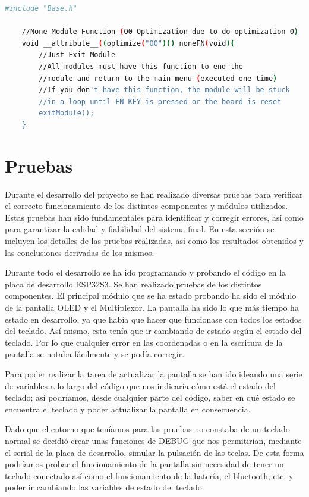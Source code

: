 \begin{lstlisting}[style=console, language=bash, caption={La función base vacía que no hace nada a forma de ejemplo. En base.h y base.cpp}, label={code:BaseFuncion}]
    #include "Base.h"

    //None Module Function (O0 Optimization due to do optimization 0)
    void __attribute__((optimize("O0"))) noneFN(void){
        //Just Exit Module
        //All modules must have this function to end the
        //module and return to the main menu (executed one time)
        //If you don't have this function, the module will be stuck 
        //in a loop until FN KEY is pressed or the board is reset
        exitModule();
    }
\end{lstlisting}

\section{Pruebas}\label{ApendicePruebas}
Durante el desarrollo del proyecto se han realizado diversas pruebas para verificar el correcto funcionamiento de los distintos componentes y módulos utilizados. Estas pruebas han sido fundamentales para identificar y corregir errores, así como para garantizar la calidad y fiabilidad del sistema final. En esta sección se incluyen los detalles de las pruebas realizadas, así como los resultados obtenidos y las conclusiones derivadas de los mismos.

Durante todo el desarrollo se ha ido programando y probando el código en la placa de desarrollo ESP32S3. Se han realizado pruebas de los distintos componentes. El principal módulo que se ha estado probando ha sido el módulo de la pantalla \gls{OLED} y el Multiplexor. La pantalla ha sido lo que más tiempo ha estado en desarrollo, ya que había que hacer que funcionase con todos los estados del teclado. Así mismo, esta tenía que ir cambiando de estado según el estado del teclado. Por lo que cualquier error en las coordenadas o en la escritura de la pantalla se notaba fácilmente y se podía corregir.

Para poder realizar la tarea de actualizar la pantalla se han ido ideando una serie de variables a lo largo del código que nos indicaría cómo está el estado del teclado; así podríamos, desde cualquier parte del código, saber en qué estado se encuentra el teclado y poder actualizar la pantalla en consecuencia.

Dado que el entorno que teníamos para las pruebas no constaba de un teclado normal se decidió crear unas funciones de \gls{DEBUG} que nos permitirían, mediante el serial de la placa de desarrollo, simular la pulsación de las teclas. De esta forma podríamos probar el funcionamiento de la pantalla sin necesidad de tener un teclado conectado así como el funcionamiento de la batería, el bluetooth, etc. y poder ir cambiando las variables de estado del teclado.

